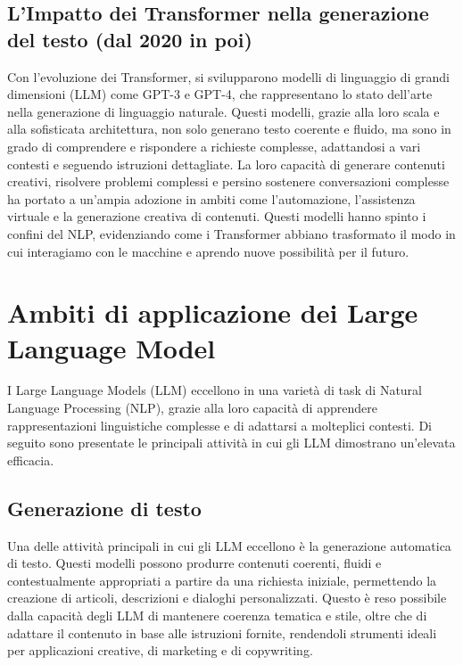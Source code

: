 \documentclass[target=mst,aauheader=,style=]{thud}
\begin{document}
\subsection{L’Impatto dei Transformer nella generazione del testo (dal 2020 in poi)}
Con l’evoluzione dei Transformer, si svilupparono modelli di linguaggio di grandi dimensioni (LLM) come GPT-3 e GPT-4, che rappresentano lo stato dell’arte nella generazione di linguaggio naturale. Questi modelli, grazie alla loro scala e alla sofisticata architettura, non solo generano testo coerente e fluido, ma sono in grado di comprendere e rispondere a richieste complesse, adattandosi a vari contesti e seguendo istruzioni dettagliate. La loro capacità di generare contenuti creativi, risolvere problemi complessi e persino sostenere conversazioni complesse ha portato a un’ampia adozione in ambiti come l’automazione, l’assistenza virtuale e la generazione creativa di contenuti. Questi modelli hanno spinto i confini del NLP, evidenziando come i Transformer abbiano trasformato il modo in cui interagiamo con le macchine e aprendo nuove possibilità per il futuro.\cite{zhao_2023}

\section{Ambiti di applicazione dei Large Language Model}
I Large Language Models (LLM) eccellono in una varietà di task di Natural Language Processing (NLP), grazie alla loro capacità di apprendere rappresentazioni linguistiche complesse e di adattarsi a molteplici contesti. Di seguito sono presentate le principali attività in cui gli LLM dimostrano un'elevata efficacia.\cite{su_2024_large_language_models_forecasting}

\subsection{Generazione di testo}
Una delle attività principali in cui gli LLM eccellono è la generazione automatica di testo. Questi modelli possono produrre contenuti coerenti, fluidi e contestualmente appropriati a partire da una richiesta iniziale, permettendo la creazione di articoli, descrizioni e dialoghi personalizzati. Questo è reso possibile dalla capacità degli LLM di mantenere coerenza tematica e stile, oltre che di adattare il contenuto in base alle istruzioni fornite, rendendoli strumenti ideali per applicazioni creative, di marketing e di copywriting.
\end{document}
